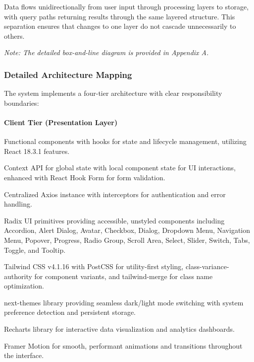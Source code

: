 \documentclass[12pt,a4paper]{article}
\begin{document}
    Data flows unidirectionally from user input through processing layers to storage, with query paths returning results through the same layered structure. This separation ensures that changes to one layer do not cascade unnecessarily to others.

    \textit{Note: The detailed box-and-line diagram is provided in Appendix A.}

    \subsubsection{Detailed Architecture Mapping}

    The system implements a four-tier architecture with clear responsibility boundaries:

    \paragraph{Client Tier (Presentation Layer)}

    \begin{description}[font=\bfseries, leftmargin=0.5in]
        \item[React Components] Functional components with hooks for state and lifecycle management, utilizing React 18.3.1 features.
        \item[State Management] Context API for global state with local component state for UI interactions, enhanced with React Hook Form for form validation.
        \item[API Client] Centralized Axios instance with interceptors for authentication and error handling.
        \item[UI Component Library] Radix UI primitives providing accessible, unstyled components including Accordion, Alert Dialog, Avatar, Checkbox, Dialog, Dropdown Menu, Navigation Menu, Popover, Progress, Radio Group, Scroll Area, Select, Slider, Switch, Tabs, Toggle, and Tooltip.
        \item[Styling System] Tailwind CSS v4.1.16 with PostCSS for utility-first styling, class-variance-authority for component variants, and tailwind-merge for class name optimization.
        \item[Theme System] next-themes library providing seamless dark/light mode switching with system preference detection and persistent storage.
        \item[Visualization] Recharts library for interactive data visualization and analytics dashboards.
        \item[Animation] Framer Motion for smooth, performant animations and transitions throughout the interface.
    \end{description}
\end{document}
